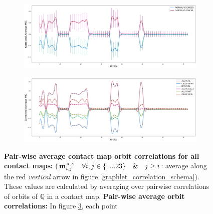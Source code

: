 \documentclass[]{article}
\begin{document}
\begin{figure}
    \centering

    \begin{subfigure}[b]{\textwidth}
        \includegraphics[width=\textwidth]{figures/orbits_correlations_cancer_vs_normal.png}
    \caption{}
    \label{fig:orbits_correlations_normal_vs_cancer}
    \end{subfigure}
    \begin{subfigure}[b]{\textwidth}
    \includegraphics[width=\textwidth]{figures/orbits_correlations_all.png}
    \caption{}
    \label{fig:orbits_correlations_all}
    \end{subfigure}
    \caption{
        \textbf{Pair-wise 
        average contact map orbit correlations
        for all contact maps:}
        ($\bar{\mathbf{m}}^{\scriptscriptstyle \scriptscriptstyle A,B}_{i,j} 
        \quad \forall i,j \in \{1 ... 23\} \quad \& \quad j \ge i$:
        average along the 
        red \textit{vertical} arrow in figure 
        \ref{graphlet_correlation_schema}).
        These values are calculated by averaging over 
        pairwise correlations of orbits of
        $\mathbb{Q}$ in a contact map.
        \textbf{Pair-wise average orbit correlations:}
        In figure \ref{fig:orbits_correlations_all}, each point
}
\end{figure}
\end{document}
